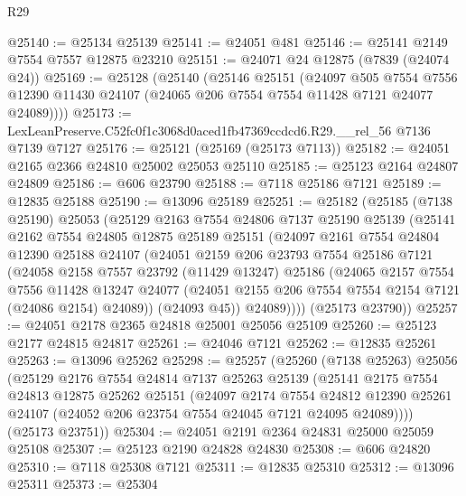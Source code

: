 \begin{lexlean}{R29}
\begin{coremodule}
@25140 := @25134 @25139
@25141 := @24051 @481
@25146 := @25141 @2149 @7554 @7557 @12875 @23210
@25151 := @24071 @24 @12875 (@7839 (@24074 @24))
@25169 := @25128
    (@25140
      (@25146
        @25151
        (@24097
          @505
          @7554
          @7556
          @12390
          @11430
          @24107
          (@24065 @206 @7554 @7554 @11428 @7121 @24077 @24089))))
@25173 := LexLeanPreserve.C52fc0f1c3068d0aced1fb47369ccdcd6.R29.__rel_56 @7136 @7139 @7127
@25176 := @25121 (@25169 (@25173 @7113))
@25182 := @24051 @2165 @2366 @24810 @25002 @25053 @25110
@25185 := @25123 @2164 @24807 @24809
@25186 := @606 @23790
@25188 := @7118 @25186 @7121
@25189 := @12835 @25188
@25190 := @13096 @25189
@25251 := @25182
    (@25185
      (@7138 @25190)
      @25053
      (@25129
        @2163
        @7554
        @24806
        @7137
        @25190
        @25139
        (@25141
          @2162
          @7554
          @24805
          @12875
          @25189
          @25151
          (@24097
            @2161
            @7554
            @24804
            @12390
            @25188
            @24107
            (@24051
              @2159
              @206
              @23793
              @7554
              @25186
              @7121
              (@24058
                @2158
                @7557
                @23792
                (@11429 @13247)
                @25186
                (@24065
                  @2157
                  @7554
                  @7556
                  @11428
                  @13247
                  @24077
                  (@24051 @2155 @206 @7554 @7554 @2154 @7121 (@24086 @2154) @24089))
                (@24093 @45))
              @24089))))
      (@25173 @23790))
@25257 := @24051 @2178 @2365 @24818 @25001 @25056 @25109
@25260 := @25123 @2177 @24815 @24817
@25261 := @24046 @7121
@25262 := @12835 @25261
@25263 := @13096 @25262
@25298 := @25257
    (@25260
      (@7138 @25263)
      @25056
      (@25129
        @2176
        @7554
        @24814
        @7137
        @25263
        @25139
        (@25141
          @2175
          @7554
          @24813
          @12875
          @25262
          @25151
          (@24097
            @2174
            @7554
            @24812
            @12390
            @25261
            @24107
            (@24052 @206 @23754 @7554 @24045 @7121 @24095 @24089))))
      (@25173 @23751))
@25304 := @24051 @2191 @2364 @24831 @25000 @25059 @25108
@25307 := @25123 @2190 @24828 @24830
@25308 := @606 @24820
@25310 := @7118 @25308 @7121
@25311 := @12835 @25310
@25312 := @13096 @25311
@25373 := @25304

\end{coremodule}
\end{lexlean}
